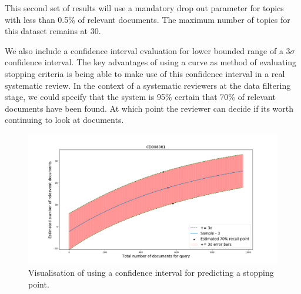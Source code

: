 This second set of results will use a mandatory drop out parameter for topics with less than 0.5\% of relevant documents.  The maximum number of topics for this dataset remains at 30.

We also include a confidence interval evaluation for lower bounded range of a $3\sigma$ confidence interval. The key advantages of using a curve as  method of evaluating stopping criteria is being able to make use of this confidence interval in a real systematic review. In the context of a systematic reviewers at the data filtering stage, we could specify that the system is 95\% certain that 70\% of relevant documents have been found. At which point the reviewer can decide if its worth continuing to look at documents.

\begin{figure}[H]
\center
\includegraphics[width=13cm]{figures/cf_example.png}
\caption{Visualisation of using a confidence interval for predicting a stopping point.}
\end{figure}



